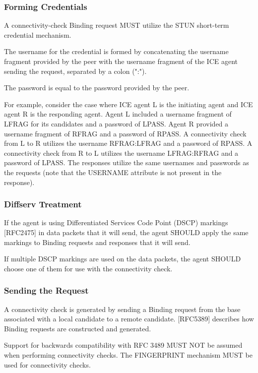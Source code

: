 \documentclass{article}
\begin{document}
\subsubsection{Forming Credentials}

A connectivity-check Binding request MUST utilize the STUN short-term credential mechanism.

The username for the credential is formed by concatenating the username fragment provided by the peer with the username fragment of the ICE agent sending the request, separated by a colon (":").

The password is equal to the password provided by the peer.

For example, consider the case where ICE agent L is the initiating agent and ICE agent R is the responding agent.  Agent L included a username fragment of LFRAG for its candidates and a password of LPASS.  Agent R provided a username fragment of RFRAG and a password of RPASS.  A connectivity check from L to R utilizes the username RFRAG:LFRAG and a password of RPASS.  A connectivity check from R to L utilizes the username LFRAG:RFRAG and a password of LPASS.  The responses utilize the same usernames and passwords as the requests (note that the USERNAME attribute is not present in the response).

\subsubsection{Diffserv Treatment}

If the agent is using Differentiated Services Code Point (DSCP) markings [RFC2475] in data packets that it will send, the agent SHOULD apply the same markings to Binding requests and responses that it will send.

If multiple DSCP markings are used on the data packets, the agent SHOULD choose one of them for use with the connectivity check.

\subsubsection{Sending the Request}

A connectivity check is generated by sending a Binding request from the base associated with a local candidate to a remote candidate. [RFC5389] describes how Binding requests are constructed and generated.

Support for backwards compatibility with RFC 3489 MUST NOT be assumed when performing connectivity checks.  The FINGERPRINT mechanism MUST be used for connectivity checks.
\end{document}
